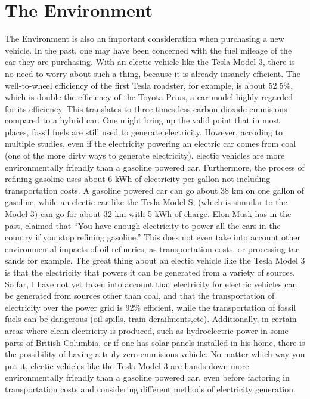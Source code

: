 \documentclass{article}
\begin{document}
  \section{The Environment}
  The Environment is also an important consideration when purchasing a new vehicle.
  In the past, one may have been concerned with the fuel mileage of the car they are purchasing.
  With an electic vehicle like the Tesla Model 3, there is no need to worry about such a thing,
  because it is already insanely efficient. The well-to-wheel efficiency of the first Tesla roadster,
  for example, is about 52.5\%, which is double the efficiency of the Toyota Prius\cite{eberhard200621},
  a car model highly regarded for its efficiency. This translates to three times less carbon dioxide
  emmisions compared to a hybrid car.\cite{eberhard200621} One might bring up the valid point that
  in most places, fossil fuels are still used to generate electricity. However, accoding to multiple
  studies, even if the electricity powering an electric car comes from coal
  (one of the more dirty ways to generate electricity),
  electic vehicles are more environmentally friendly than a gasoline powered car.\cite{cleanerevenwithcoal}
  Furthermore, the process of refining gasoline uses about 6 kWh of electricity per gallon not including transportation costs.
  A gasoline powered car can go about 38 km on one gallon of gasoline, while an electic car like the Tesla Model S,
  (which is simuilar to the Model 3) can go for about 32 km with 5 kWh of charge. Elon Musk has
  in the past, claimed that ``You have enough electricity to power all the cars
  in the country if you stop refining gasoline.''\cite{rosoff_elon_nodate}
  This does not even take into account other environmental impacts of oil refineries,
  as transportation costs, or processing tar sands for example.\cite{6kwh}
  The great thing about an electic vehicle like the Tesla Model 3 is that
  the electricity that powers it can be generated from a variety of sources.\cite{eberhard200621}
  So far, I have not yet taken into account that electricity for electric vehicles can be generated
  from sources other than coal, and that the transportation of electricity over the power grid is
  92\% efficient\cite{eberhard200621}, while the transportation of fossil fuels
  can be dangerous (oil spills, train derailments,etc). Additionally, in certain areas where clean electricity is produced, such
  as hydroelectric power in some parts of British Columbia, or if one has solar
  panels installed in his home, there is the possibility of having a truly zero-emmisions vehicle.
  No matter which way you put it, electic vehicles like the Tesla Model 3 are hands-down
  more environmentally friendly than a gasoline powered car, even before factoring in transportation
  costs and considering different methods of electricity generation.
\end{document}
